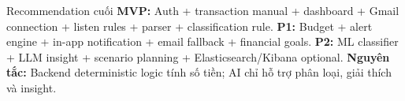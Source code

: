 \documentclass[11pt,a4paper]{article}
\begin{document}
\begin{summarybox}{Recommendation cuối}
\textbf{MVP:} Auth + transaction manual + dashboard + Gmail connection + listen rules + parser + classification rule.\newline
\textbf{P1:} Budget + alert engine + in-app notification + email fallback + financial goals.\newline
\textbf{P2:} ML classifier + LLM insight + scenario planning + Elasticsearch/Kibana optional.\newline
\textbf{Nguyên tắc:} Backend deterministic logic tính số tiền; AI chỉ hỗ trợ phân loại, giải thích và insight.
\end{summarybox}
\end{document}
